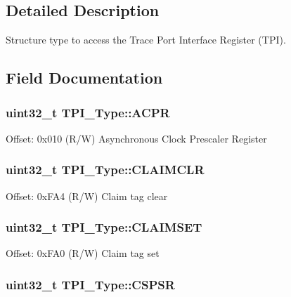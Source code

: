 \subsection{Detailed Description}
Structure type to access the Trace Port Interface Register (T\-P\-I). 

\subsection{Field Documentation}
\hypertarget{structTPI__Type_ad75832a669eb121f6fce3c28d36b7fab}{
\subsubsection[{A\-C\-P\-R}]{ uint32\-\_\-t T\-P\-I\-\_\-\-Type\-::\-A\-C\-P\-R}}\label{structTPI__Type_ad75832a669eb121f6fce3c28d36b7fab}
Offset\-: 0x010 (R/\-W) Asynchronous Clock Prescaler Register \hypertarget{structTPI__Type_a44efa6045512c8d4da64b0623f7a43ad}{
\subsubsection[{C\-L\-A\-I\-M\-C\-L\-R}]{ uint32\-\_\-t T\-P\-I\-\_\-\-Type\-::\-C\-L\-A\-I\-M\-C\-L\-R}}\label{structTPI__Type_a44efa6045512c8d4da64b0623f7a43ad}
Offset\-: 0x\-F\-A4 (R/\-W) Claim tag clear \hypertarget{structTPI__Type_a2e4d5a07fabd771fa942a171230a0a84}{
\subsubsection[{C\-L\-A\-I\-M\-S\-E\-T}]{ uint32\-\_\-t T\-P\-I\-\_\-\-Type\-::\-C\-L\-A\-I\-M\-S\-E\-T}}\label{structTPI__Type_a2e4d5a07fabd771fa942a171230a0a84}
Offset\-: 0x\-F\-A0 (R/\-W) Claim tag set \hypertarget{structTPI__Type_aa723ef3d38237aa2465779b3cc73a94a}{
\subsubsection[{C\-S\-P\-S\-R}]{ uint32\-\_\-t T\-P\-I\-\_\-\-Type\-::\-C\-S\-P\-S\-R}}\label{structTPI__Type_aa723ef3d38237aa2465779b3cc73a94a}
